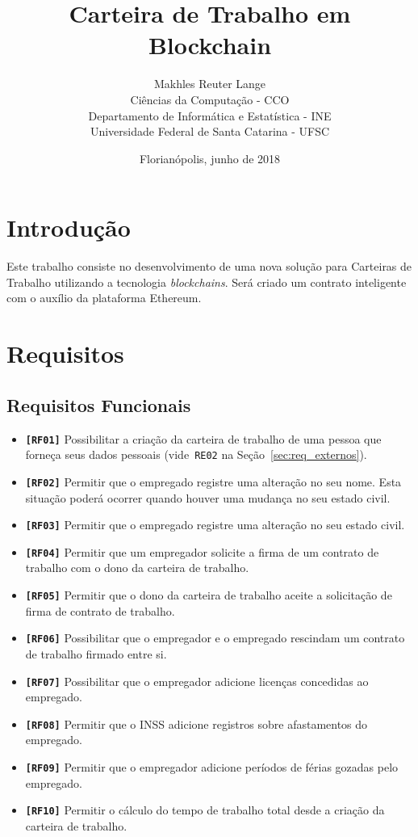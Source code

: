 \documentclass[a4paper,10pt]{article}
\author{Makhles Reuter Lange \\
        Ciências da Computação - CCO \\
        Departamento de Informática e Estatística - INE \\
        Universidade Federal de Santa Catarina - UFSC}
\title{Carteira de Trabalho em Blockchain}
\date{Florianópolis, junho de 2018}
\begin{document}
\maketitle

\section{Introdução}

Este trabalho consiste no desenvolvimento de uma nova solução para Carteiras de Trabalho utilizando a tecnologia \emph{blockchains}. Será criado um contrato inteligente com o auxílio da plataforma Ethereum.

\section{Requisitos}\label{sec:req}
\subsection{Requisitos Funcionais}\label{sec:req_funcionais}

\begin{itemize}
  \item \textbf{\texttt{[RF01]}} Possibilitar a criação da carteira de trabalho de uma pessoa que forneça seus dados pessoais (vide~\texttt{RE02} na Seção~\ref{sec:req_externos}). 
  \item \textbf{\texttt{[RF02]}} Permitir que o empregado registre uma alteração no seu nome. Esta situação poderá ocorrer quando houver uma mudança no seu estado civil.
  \item \textbf{\texttt{[RF03]}} Permitir que o empregado registre uma alteração no seu estado civil.
  \item \textbf{\texttt{[RF04]}} Permitir que um empregador solicite a firma de um contrato de trabalho com o dono da carteira de trabalho.
  \item \textbf{\texttt{[RF05]}} Permitir que o dono da carteira de trabalho aceite a solicitação de firma de contrato de trabalho.
  \item \textbf{\texttt{[RF06]}} Possibilitar que o empregador e o empregado rescindam um contrato de trabalho firmado entre si.
  \item \textbf{\texttt{[RF07]}} Possibilitar que o empregador adicione licenças concedidas ao empregado. 
  \item \textbf{\texttt{[RF08]}} Permitir que o INSS adicione registros sobre afastamentos do empregado.
  \item \textbf{\texttt{[RF09]}} Permitir que o empregador adicione períodos de férias gozadas pelo empregado.
  \item \textbf{\texttt{[RF10]}} Permitir o cálculo do tempo de trabalho total desde a criação da carteira de trabalho.
\end{itemize}
\end{document}
